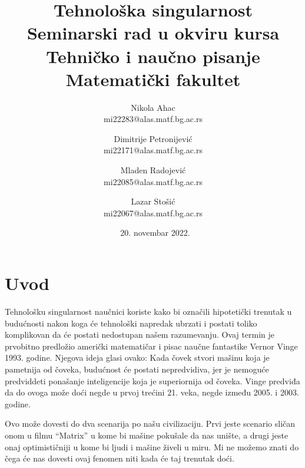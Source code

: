 \documentclass[a4paper]{article}
\begin{document}
\title{Tehnološka singularnost\\ \small{Seminarski rad u okviru kursa\\Tehničko i naučno pisanje\\ Matematički fakultet}}

\author{Nikola Ahac\\ mi22283@alas.matf.bg.ac.rs \and Dimitrije Petronijević\\ mi22171@alas.matf.bg.ac.rs \and Mladen Radojević \\ mi22085@alas.matf.bg.ac.rs \and Lazar Stošić \\ mi22067@alas.matf.bg.ac.rs}

\date{~20. novembar 2022.}
\maketitle


\tableofcontents

\newpage

\section{Uvod}
\label{sec:uvod}
Tehnološku singularnost naučnici koriste kako bi označili hipotetički trenutak u budućnosti nakon koga će tehnološki napredak ubrzati i postati toliko komplikovan da će postati nedostupan našem razumevanju. Ovaj termin je prvobitno predložio američki matematičar i pisac naučne fantastike Vernor Vinge 1993. godine. Njegova ideja glasi ovako: Kada čovek stvori mašinu koja je pametnija od čoveka, budućnost će postati nepredvidiva, jer je nemoguće predviddeti ponašanje inteligencije koja je superiornija od čoveka. Vinge predviđa da do ovoga može doći negde u prvoj trećini 21. veka, negde između 2005. i 2003. godine. 

Ovo može dovesti do dva scenarija po našu civilizaciju. Prvi jeste scenario sličan onom u filmu “Matrix” u kome bi mašine pokušale da nas unište, a drugi jeste onaj optimističniji u kome bi ljudi i mašine živeli u miru. Mi ne možemo znati do čega će nas dovesti ovaj fenomen niti kada će taj trenutak doći.
\end{document}
